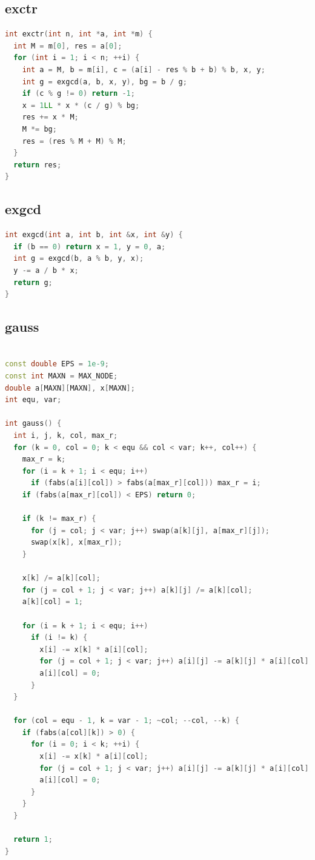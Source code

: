 \documentclass[twoside]{article}
\begin{document}
\subsection{exctr}
\begin{lstlisting}[language=c++]
int exctr(int n, int *a, int *m) {
  int M = m[0], res = a[0];
  for (int i = 1; i < n; ++i) {
    int a = M, b = m[i], c = (a[i] - res % b + b) % b, x, y;
    int g = exgcd(a, b, x, y), bg = b / g;
    if (c % g != 0) return -1;
    x = 1LL * x * (c / g) % bg;
    res += x * M;
    M *= bg;
    res = (res % M + M) % M;
  }
  return res;
}

\end{lstlisting}
\subsection{exgcd}
\begin{lstlisting}[language=c++]
int exgcd(int a, int b, int &x, int &y) {
  if (b == 0) return x = 1, y = 0, a;
  int g = exgcd(b, a % b, y, x);
  y -= a / b * x;
  return g;
}

\end{lstlisting}
\subsection{gauss}
\begin{lstlisting}[language=c++]

const double EPS = 1e-9;
const int MAXN = MAX_NODE;
double a[MAXN][MAXN], x[MAXN];
int equ, var;

int gauss() {
  int i, j, k, col, max_r;
  for (k = 0, col = 0; k < equ && col < var; k++, col++) {
    max_r = k;
    for (i = k + 1; i < equ; i++)
      if (fabs(a[i][col]) > fabs(a[max_r][col])) max_r = i;
    if (fabs(a[max_r][col]) < EPS) return 0;

    if (k != max_r) {
      for (j = col; j < var; j++) swap(a[k][j], a[max_r][j]);
      swap(x[k], x[max_r]);
    }

    x[k] /= a[k][col];
    for (j = col + 1; j < var; j++) a[k][j] /= a[k][col];
    a[k][col] = 1;

    for (i = k + 1; i < equ; i++)
      if (i != k) {
        x[i] -= x[k] * a[i][col];
        for (j = col + 1; j < var; j++) a[i][j] -= a[k][j] * a[i][col];
        a[i][col] = 0;
      }
  }

  for (col = equ - 1, k = var - 1; ~col; --col, --k) {
    if (fabs(a[col][k]) > 0) {
      for (i = 0; i < k; ++i) {
        x[i] -= x[k] * a[i][col];
        for (j = col + 1; j < var; j++) a[i][j] -= a[k][j] * a[i][col];
        a[i][col] = 0;
      }
    }
  }

  return 1;
}

\end{lstlisting}
\end{document}
